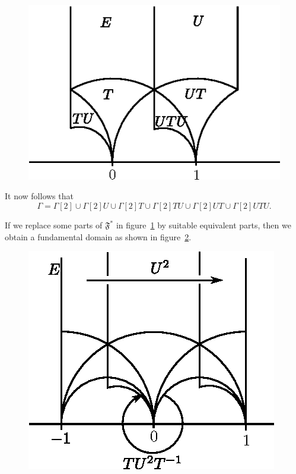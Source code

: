 \begin{figure}[H]
\centering
\includegraphics{vol29-fig/fig29-14.eps}
\smallskip
\caption{}
\label{chap2:fig14}
\end{figure}

It now follows that
$$
\Gamma = \Gamma [2] \cup \Gamma [2] U \cup \Gamma [2] T \cup \Gamma
       [2] TU \cup \Gamma [2] U T \cup \Gamma [2] U T U.
$$

If we replace some parts of $\mathfrak{F}^{\ast}$ in figure~\ref{chap2:fig14} by
suitable equivalent parts, then we obtain a fundamental domain as
shown in figure~\ref{chap2:fig15}.
\begin{figure}[H]
\centering
\includegraphics{vol29-fig/fig29-15.eps}
\smallskip
\caption{}
\label{chap2:fig15}
\end{figure}\pageoriginale

